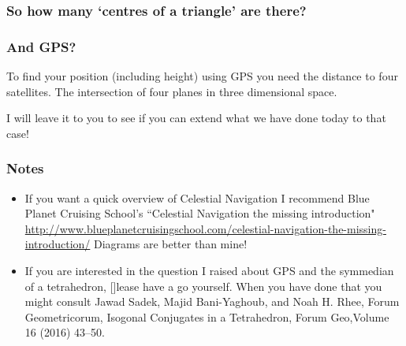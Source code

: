 \documentclass{beamer}
\begin{document}
\begin{frame}
\frametitle{So how many `centres of a triangle' are there? }
\vspace{-0.5cm}
\begin{center}



\end{center}

\end{frame}

\begin{frame}\frametitle{And GPS?}
To find your position (including height) using GPS you need the distance to four satellites. The intersection of four planes in three dimensional space.

I will leave it to you to see if you can extend what we have done today to that case!
\end{frame}


\begin{frame}\frametitle{Notes}
\small
\begin{itemize}
\item If you want a quick overview of Celestial Navigation I recommend Blue Planet Cruising School's ``Celestial Navigation the missing introduction" \url{http://www.blueplanetcruisingschool.com/celestial-navigation-the-missing-introduction/} Diagrams are better than mine!
\item If you are interested in the question I raised about GPS and the symmedian of a tetrahedron, []lease have a go yourself. When you have done that you might consult Jawad Sadek, Majid Bani-Yaghoub, and Noah H. Rhee, Forum Geometricorum, Isogonal Conjugates in a Tetrahedron,
Forum Geo,Volume 16 (2016) 43–50.
\end{itemize}
\end{frame}
\end{document}
